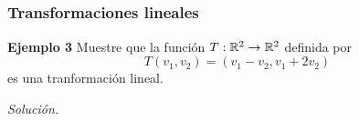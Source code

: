 
\subsection{}

\begin{frame}\frametitle{Transformaciones lineales}


\begin{ej}{\textbf{Ejemplo 3}}
	\justifying
	Muestre que la función $T:\mathbb{R}^2\to \mathbb{R}^2$ definida por 
	\[
	T(v_1,v_2) = (v_1-v_2, v_1+2v_2)
	\]
	es una tranformación lineal.
\end{ej}
\textit{Solución.}

\end{frame}


\subsection{}

